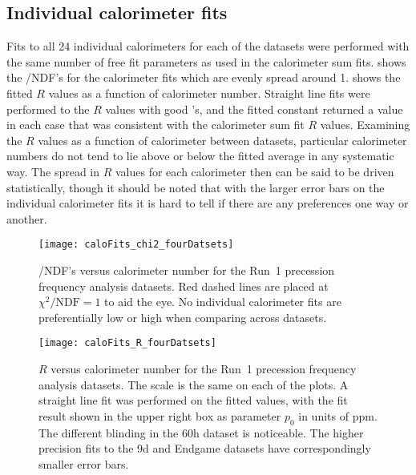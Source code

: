 
\subsection{Individual calorimeter fits}
\label{sub:per_calorimeter_fits}


Fits to all 24 individual calorimeters for each of the datasets were performed with the same number of free fit parameters as used in the calorimeter sum fits.  shows the \chisq/NDF's for the calorimeter fits which are evenly spread around 1.  shows the fitted $R$ values as a function of calorimeter number. Straight line fits were performed to the $R$ values with good \chisq's, and the fitted constant returned a value in each case that was consistent with the calorimeter sum fit $R$ values. Examining the $R$ values as a function of calorimeter between datasets, particular calorimeter numbers do not tend to lie above or below the fitted average in any systematic way. The spread in $R$ values for each calorimeter then can be said to be driven statistically, though it should be noted that with the larger error bars on the individual calorimeter fits it is hard to tell if there are any preferences one way or another.


\begin{figure}
\centering
\texttt{[image: caloFits\_chi2\_fourDatsets]}
    \caption[\chisq/NDF's versus calorimeter number]{\chisq/NDF's versus calorimeter number for the Run~1 precession frequency analysis datasets. Red dashed lines are placed at $\chi^{2}/\text{NDF} = 1$ to aid the eye. No individual calorimeter fits are preferentially low or high when comparing across datasets.}
    \label{fig:caloFits_chi2}
\vspace{4mm}
\texttt{[image: caloFits\_R\_fourDatsets]}
    \caption[$R$ versus calorimeter number]{$R$ versus calorimeter number for the Run~1 precession frequency analysis datasets. The scale is the same on each of the plots.  A straight line fit was performed on the fitted values, with the fit result shown in the upper right box as parameter $p_{0}$ in units of ppm. The different blinding in the 60h dataset is noticeable. The higher precision fits to the 9d and Endgame datasets have correspondingly smaller error bars.}
    \label{fig:caloFits_R}
\end{figure}


